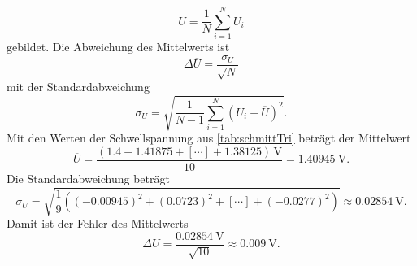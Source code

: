 \begin{equation}
\overline{U} = \frac{1}{N} \sum_{i=1}^{N} U_i
\label{eqn:mittelwert}
\end{equation}
gebildet.
Die Abweichung des Mittelwerts ist 
\begin{equation}
\Delta \overline{U} = \frac{\sigma_U}{\sqrt{N}}
\label{eqn:standardmittelwert}
\end{equation}
mit der Standardabweichung
\begin{equation}
\sigma_U = \sqrt{\frac{1}{N - 1} \sum_{i=1}^{N} {\left( U_i - \overline{U} \right)}^2}.
\label{eqn:standardabweichung}
\end{equation}
Mit den Werten der Schwellspannung aus \autoref{tab:schmittTri} beträgt der Mittelwert
\begin{equation*}
  \overline{U} = \frac{(1.4+1.41875+[\cdots]+1.38125)\,\unit{\volt}}{10} = \qty{1.40945}{\volt}.
\end{equation*}
Die Standardabweichung beträgt
\begin{equation*}
  \sigma_U = \sqrt{\frac{1}{9}\left((-0.00945)^2+(0.0723)^2+[\cdots]+(-0.0277)^2\right)} \approx \qty{0.02854}\volt.
\end{equation*}
Damit ist der Fehler des Mittelwerts
\begin{equation*}
  \Delta\overline{U} = \frac{\qty{0.02854}{\volt}}{\sqrt{10}} \approx \qty{0.009}{\volt}.
\end{equation*}


